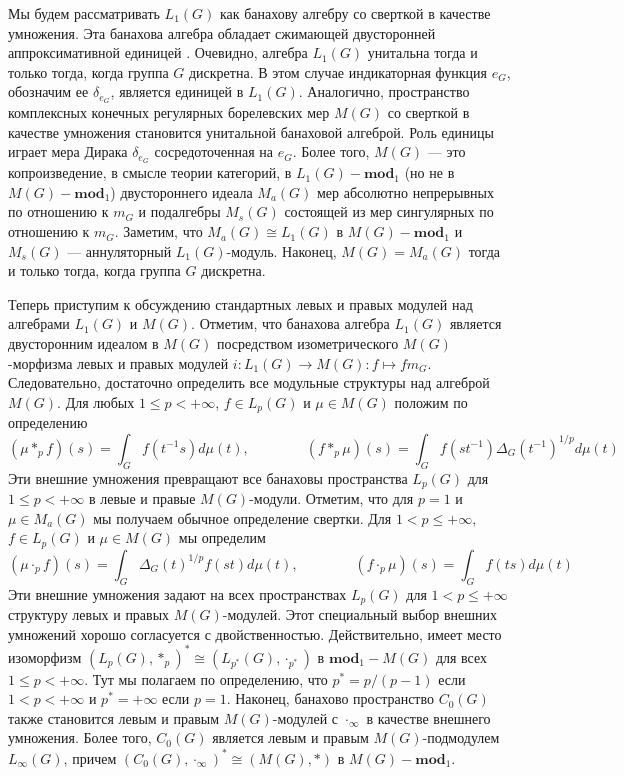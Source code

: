 \documentclass{article}
\numberwithin{equation}{section}
\theoremstyle{plain}
\theoremstyle{definition}
\newcommand{\convol}{\ast}
\newcommand{\isom}{\mathop{\mathbin{\cong}}}
\begin{document}
\begin{fulltext}
Мы будем рассматривать $L_1(G)$ как банахову алгебру со сверткой в качестве умножения. 
Эта банахова алгебра обладает сжимающей двусторонней аппроксимативной единицей 
\cite[теорема~3.3.23]{DalBanAlgAutCont}. Очевидно, алгебра $L_1(G)$ унитальна 
тогда и только тогда, когда группа $G$ дискретна. В этом случае индикаторная 
функция $e_G$, обозначим ее $\delta_{e_G}$, является единицей в $L_1(G)$. Аналогично, 
пространство комплексных конечных регулярных борелевских мер $M(G)$ со сверткой в 
качестве умножения становится унитальной банаховой алгеброй. Роль единицы играет 
мера Дирака $\delta_{e_G}$ сосредоточенная на $e_G$. Более того, $M(G)$ --- это 
копроизведение, в смысле теории категорий, в $L_1(G)-\mathbf{mod}_1$ 
(но не в $M(G)-\mathbf{mod}_1$) двустороннего идеала $M_a(G)$ мер абсолютно непрерывных 
по отношению к $m_G$ и подалгебры $M_s(G)$ состоящей из мер сингулярных по отношению 
к $m_G$. Заметим, что $M_a(G)\isom L_1(G)$ в $M(G)-\mathbf{mod}_1$ и $M_s(G)$ --- 
аннуляторный $L_1(G)$-модуль. Наконец, $M(G)=M_a(G)$ тогда и только тогда, когда 
группа $G$ дискретна.

Теперь приступим к обсуждению стандартных левых и правых модулей над алгебрами 
$L_1(G)$ и $M(G)$. Отметим, что банахова алгебра $L_1(G)$ является двусторонним 
идеалом в $M(G)$ посредством изометрического $M(G)$-морфизма левых и правых модулей 
$i:L_1(G)\to M(G):f\mapsto f m_G$. Следовательно, достаточно определить все модульные 
структуры над алгеброй $M(G)$. Для любых $1\leq p<+\infty$, 
$f\in L_p(G)$ и $\mu\in M(G)$ положим по определению
\[
(\mu\convol_p f)(s)=\int_G f(t^{-1}s)d\mu(t),
\qquad\qquad
(f\convol_p \mu)(s)=\int_G f(st^{-1})\Delta_G(t^{-1})^{1/p}d\mu(t)
\]
Эти внешние умножения превращают все банаховы пространства $L_p(G)$ для 
$1\leq p<+\infty$ в левые и правые $M(G)$-модули. Отметим, что для $p=1$ и 
$\mu\in M_a(G)$ мы получаем обычное определение свертки. Для $1<p\leq +\infty$, 
$f\in L_p(G)$ и $\mu\in M(G)$ мы определим
\[
(\mu\cdot_p f)(s)=\int_G \Delta_G(t)^{1/p}f(st)d\mu(t),
\qquad\qquad
(f\cdot_p \mu)(s)=\int_G f(ts)d\mu(t)
\]
Эти внешние умножения задают на всех пространствах $L_p(G)$ для $1<p\leq+\infty$ 
структуру левых и правых $M(G)$-модулей. Этот специальный выбор внешних умножений 
хорошо согласуется с двойственностью. Действительно, имеет место изоморфизм 
$(L_p(G),\convol_p)^*\isom (L_{p^*}(G),\cdot_{p^*})$ в $\mathbf{mod}_1-M(G)$ для 
всех $1\leq p<+\infty$. Тут мы полагаем по определению, что $p^*=p/(p-1)$ если 
$1<p<+\infty$ и $p^*=+\infty$ если $p=1$. Наконец, банахово пространство $C_0(G)$ 
также становится левым и правым $M(G)$-модулей с $\cdot_\infty$ в качестве 
внешнего умножения. Более того, $C_0(G)$ является левым и правым $M(G)$-подмодулем 
$L_\infty(G)$, причем  $(C_0(G),\cdot_\infty)^*\isom (M(G),\convol)$ в 
$M(G)-\mathbf{mod}_1$.


\end{fulltext}
\end{document}
